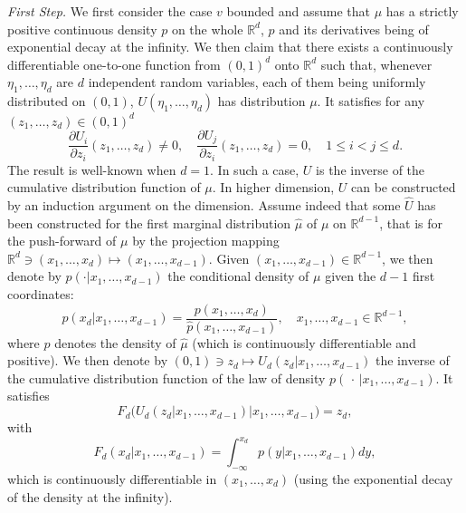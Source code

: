\documentclass[11pt]{amsart}
\begin{document}
\textit{First Step.} 
We first consider the case $v$ bounded and assume that $\mu$ has a strictly positive continuous density $p$ on the whole ${\mathbb R}^d$, $p$ and its derivatives being of exponential decay at the infinity. 
We then claim that there exists a continuously differentiable one-to-one function from $(0,1)^d$ onto  ${\mathbb R}^d$ such that, whenever 
$\eta_{1},\dots,\eta_{d}$ are $d$ independent random variables, each of them being uniformly distributed on $(0,1)$,
 $U(\eta_{1},\dots,\eta_{d})$ has distribution $\mu$. It satisfies for any $(z_{1},\dots,z_{d}) \in (0,1)^d$
 \begin{equation*}
 \frac{\partial U_{i}}{\partial z_{i}}(z_{1},\dots,z_{d}) \not = 0, \quad
  \frac{\partial U_{j}}{\partial z_{i}}(z_{1},\dots,z_{d}) = 0, \quad 1 \leq i < j \leq d. 
 \end{equation*}
 The result is well-known when $d=1$. In such a case, $U$ is the inverse of the cumulative distribution function of $\mu$. In higher dimension, $U$ can be constructed by an induction argument on the dimension. Assume indeed that some $\hat{U}$ has been constructed for the first marginal distribution $\hat{\mu}$ of $\mu$ on ${\mathbb R}^{d-1}$, that is for the push-forward of $\mu$ by the projection  
 mapping ${\mathbb R}^d \ni (x_{1},\dots,x_{d}) \mapsto (x_{1},\dots,x_{d-1})$.  Given $(x_{1},\dots,x_{d-1}) \in {\mathbb R}^{d-1}$, we then denote by $p(\cdot \vert x_{1},\dots,x_{d-1})$ the conditional density of $\mu$ given the $d-1$ first coordinates:
 \begin{equation*}
 p(x_{d} \vert x_{1},\dots,x_{d-1}) = \frac{p(x_{1},\dots,x_{d})}{\hat{p}(x_{1},\dots,x_{{d-1}})}, \quad 
 x_{1},\dots,x_{d-1} \in {\mathbb R}^{d-1},
 \end{equation*}
 where $\hat{p}$ denotes the density of $\hat{\mu}$ (which is continuously differentiable and positive). We then denote by 
 $(0,1) \ni z_{d} \mapsto U_{d}(z_{d}\vert x_{1},\dots,x_{d-1})$ the inverse of the cumulative distribution function of the law of density $p(\, \cdot \, \vert x_{1},\dots,x_{d-1})$. It satisfies
 \begin{equation*}
 F_{d}\bigl(U_{d}(z_{d}\vert x_{1},\dots,x_{d-1}) \vert x_{1},\dots,x_{d-1}\bigr) = z_{d},
 \end{equation*} 
 with
 \begin{equation*}
 F_{d}(x_{d}\vert x_{1},\dots,x_{d-1}) = \int_{-\infty}^{x_{d}} p(y \vert x_{1},\dots,x_{d-1}) dy,
 \end{equation*}
 which is continuously differentiable in $(x_{1},\dots,x_{d})$ (using the exponential decay of the density at the infinity). 
\end{document}
